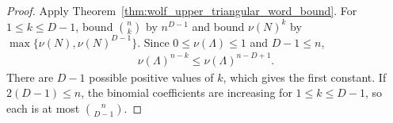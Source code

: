\begin{proof}
    \leanok
    Apply Theorem~\ref{thm:wolf_upper_triangular_word_bound}.  For
    $1\le k\le D-1$, bound $\binom{n}{k}$ by $n^{D-1}$ and bound
    $\nu(N)^k$ by $\max\{\nu(N),\nu(N)^{D-1}\}$.  Since
    $0\le\nu(\Lambda)\le1$ and $D-1\le n$,
    \begin{align}
      \nu(\Lambda)^{n-k}\le\nu(\Lambda)^{n-D+1}.
    \end{align}
    There are $D-1$ possible positive values of $k$, which gives the first
    constant.  If $2(D-1)\le n$, the binomial coefficients are increasing for
    $1\le k\le D-1$, so each is at most $\binom{n}{D-1}$.

\end{proof}
